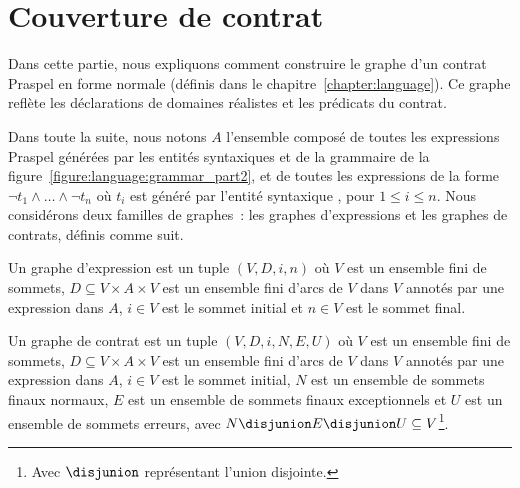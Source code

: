 \section{Couverture de contrat}
\label{section:test:contract}

Dans cette partie, nous expliquons comment construire le graphe d'un contrat
Praspel en forme normale (définis dans le chapitre~\ref{chapter:language}). Ce
graphe reflète les déclarations de domaines réalistes et les prédicats du
contrat.

Dans toute la suite, nous notons $A$ l'ensemble composé de toutes les
expressions Praspel générées par les entités syntaxiques  et
 de la grammaire de la
figure~\ref{figure:language:grammar_part2}, et de toutes les expressions de la
forme $\neg t_1 \land \dots \land \neg t_n$ où $t_i$ est généré par l'entité
syntaxique , pour $1 \leq i \leq n$. Nous
considérons deux familles de graphes~: les {\strong graphes d'expressions}
et les {\strong graphes de contrats}, définis comme suit.

\begin{definition}

Un {\strong graphe d'expression} est un tuple $(V, D, i, n)$ où $V$ est un
ensemble fini de {\strong sommets}, $D \subseteq V \times A \times V$ est un
ensemble fini d'{\strong arcs} de $V$ dans $V$ annotés par une {\strong
expression} dans $A$, $i \in V$ est le {\strong sommet initial} et $n \in V$ est
le {\strong sommet final}.

\end{definition}

\begin{definition}

Un {\strong graphe de contrat} est un tuple $(V, D, i, N, E, U)$ où $V$ est un
ensemble fini de {\strong sommets}, $D \subseteq V \times A \times V$ est un
ensemble fini d'{\strong arcs} de $V$ dans $V$ annotés par une expression dans
$A$, $i \in V$ est le {\strong sommet initial}, $N$ est un ensemble de {\strong
sommets finaux normaux}, $E$ est un ensemble de {\strong sommets finaux
exceptionnels} et $U$ est un ensemble de {\strong sommets erreurs}, avec $N
\disjunion E \disjunion U \subseteq V$\footnote{Avec $\disjunion$ représentant
l'union disjointe.}.

\end{definition}


